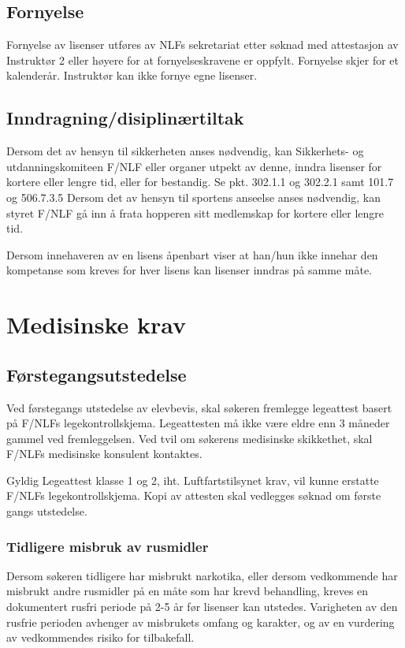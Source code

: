 \subsection{Fornyelse}
Fornyelse av lisenser utføres av NLFs sekretariat etter søknad med attestasjon av Instruktør 2 eller høyere for at fornyelseskravene er oppfylt. Fornyelse skjer for et kalenderår. Instruktør kan ikke fornye egne lisenser.

\subsection{Inndragning/disiplinærtiltak}
Dersom det av hensyn til sikkerheten anses nødvendig, kan Sikkerhets- og utdanningskomiteen F/NLF eller organer utpekt av denne, inndra lisenser for kortere eller lengre tid, eller for bestandig. Se pkt. 302.1.1 og 302.2.1 samt 101.7 og 506.7.3.5 Dersom det av hensyn til sportens anseelse anses nødvendig, kan styret F/NLF gå inn å frata hopperen sitt medlemskap for kortere eller lengre tid.

Dersom innehaveren av en lisens åpenbart viser at han/hun ikke innehar den kompetanse som kreves for hver lisens kan lisenser inndras på samme måte.

\section{Medisinske krav}
\subsection{Førstegangsutstedelse}
Ved førstegangs utstedelse av elevbevis, skal søkeren fremlegge legeattest basert på F/NLFs legekontrollskjema. Legeattesten må ikke være eldre enn 3 måneder gammel ved fremleggelsen. Ved tvil om søkerens medisinske skikkethet, skal F/NLFs medisinske konsulent kontaktes.

Gyldig Legeattest klasse 1 og 2, iht. Luftfartstilsynet krav, vil kunne erstatte F/NLFs legekontrollskjema. Kopi av attesten skal vedlegges søknad om første gangs utstedelse.

\subsubsection{Tidligere misbruk av rusmidler}
Dersom søkeren tidligere har misbrukt narkotika, eller dersom vedkommende har misbrukt andre rusmidler på en måte som har krevd behandling, kreves en dokumentert rusfri periode på 2-5 år før lisenser kan utstedes. Varigheten av den rusfrie perioden avhenger av misbrukets omfang og karakter, og av en vurdering av vedkommendes risiko for tilbakefall.

